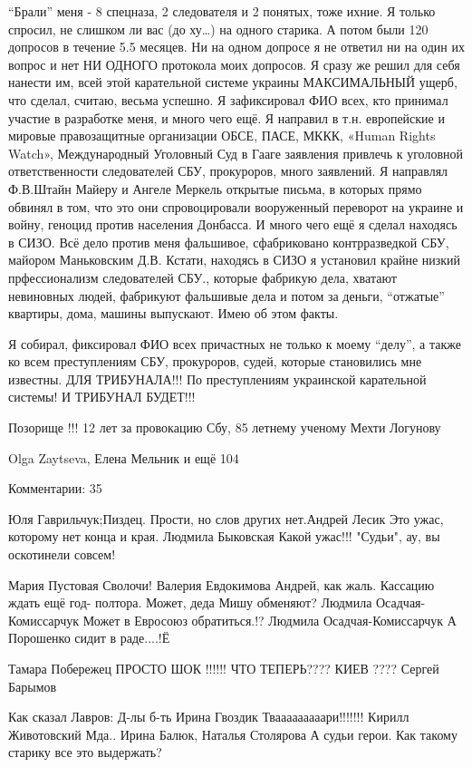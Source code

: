 \enquote{Брали}  меня - 8 спецназа, 2 следователя и 2 понятых, тоже ихние. Я только
спросил, не слишком ли вас (до ху…) на одного старика. А потом были 120
допросов в течение 5.5 месяцев. Ни на одном допросе я не ответил ни на один их
вопрос и нет НИ ОДНОГО протокола моих  допросов.  Я сразу же решил для себя
нанести им, всей этой карательной системе украины МАКСИМАЛЬНЫЙ ущерб, что
сделал, считаю, весьма успешно.  Я зафиксировал ФИО всех, кто принимал участие
в разработке меня, и много чего ещё.  Я направил в т.н. европейские и мировые
правозащитные организации ОБСЕ, ПАСЕ, МККК, «Human Rights Watch»,
Международный Уголовный Суд в Гааге заявления привлечь к уголовной
ответственности  следователей СБУ, прокуроров,  много заявлений. Я направлял
Ф.В.Штайн Майеру и Ангеле Меркель открытые письма, в которых прямо обвинял  в
том,  что это они спровоцировали вооруженный переворот на украине и войну,
геноцид против населения Донбасса.  И много чего ещё я сделал находясь  в СИЗО.
Всё дело против меня  фальшивое, сфабриковано контрразведкой СБУ, майором
Маньковским Д.В. Кстати, находясь в СИЗО я установил крайне низкий
прфессионализм следователей СБУ., которые фабрикую дела, хватают невиновных
людей, фабрикуют фальшивые дела и потом за деньги,  “отжатые” квартиры, дома,
машины  выпускают. Имею об этом факты.

Я собирал, фиксировал ФИО всех причастных не только к моему  “делу”, а также ко
всем преступлениям СБУ, прокуроров, судей, которые становились мне известны.
ДЛЯ ТРИБУНАЛА!!!  По преступлениям украинской карательной системы!   И ТРИБУНАЛ
БУДЕТ!!!

Позорище !!! 12 лет за провокацию Сбу, 85 летнему ученому Мехти Логунову

Olga Zaytseva, Елена Мельник и ещё 104

Комментарии: 35

Юля Гаврильчук;Пиздец. Прости, но слов других нет.Андрей Лесик Это ужас,
которому нет конца и края. Людмила Быковская Какой ужас!!! "Судьи", ау, вы
оскотинели совсем! 

Мария Пустовая Сволочи! Валерия Евдокимова Андрей, как жаль. Кассацию ждать ещё
год- полтора. Может, деда Мишу обменяют? Людмила Осадчая-Комиссарчук Может в
Евросоюз обратиться.!? Людмила Осадчая-Комиссарчук А Порошенко сидит в
раде....!Ё

Тамара Побережец ПРОСТО ШОК !!!!!! ЧТО ТЕПЕРЬ???? КИЕВ ???? Сергей Барымов

Как сказал Лавров: Д-лы б-ть Ирина Гвоздик Твааааааааари!!!!!!!
Кирилл Животовский Мда.. Ирина Балюк, Наталья Столярова А судьи герои. Как
такому старику все это выдержать? 

